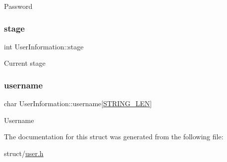 Password \mbox{\label{structUserInformation_a3ad74546e96bda1f918d34ba6694bcd6}} 
\subsubsection{\texorpdfstring{stage}{stage}}
{\footnotesize\ttfamily int User\+Information\+::stage}

Current stage \mbox{\label{structUserInformation_a77933224f8f87f2e654e92c76fb2d766}} 
\subsubsection{\texorpdfstring{username}{username}}
{\footnotesize\ttfamily char User\+Information\+::username\mbox{[}\hyperlink{user_8h_ad6d94ce273637446121c9cbd16b6077f}{S\+T\+R\+I\+N\+G\+\_\+\+L\+EN}\mbox{]}}

Username 

The documentation for this struct was generated from the following file\+:\begin{DoxyCompactItemize}
\item 
struct/\hyperlink{user_8h}{user.\+h}\end{DoxyCompactItemize}
